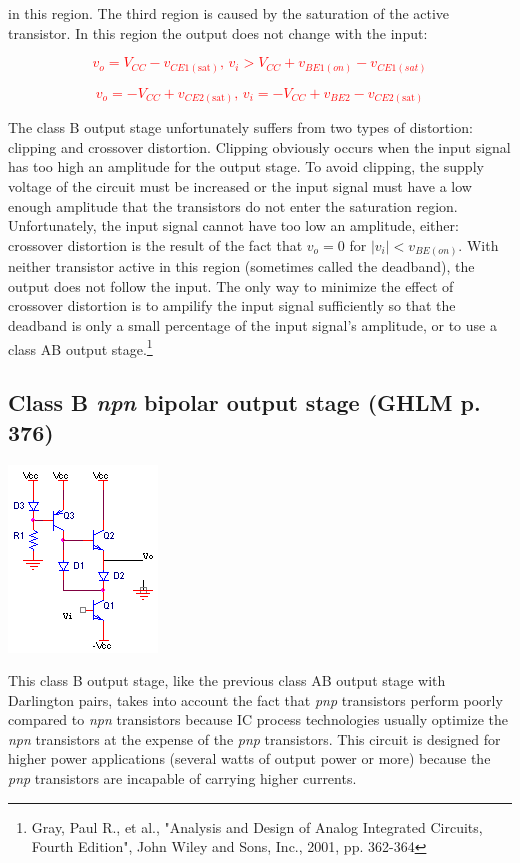 in this region. The third region is caused by the saturation of the active transistor. In this region the output does not change with the input:

\textcolor{red}{
\begin{equation}
v_{o} = V_{CC}-v_{CE1(\text{sat})}\text{, }v_{i} > V_{CC} + v_{BE1(on)} - v_{CE1(sat)}
\end{equation}
}

\textcolor{red}{
\begin{equation}
v_{o} = -V_{CC}+v_{CE2(\text{sat})}\text{, }v_{i} = -V_{CC}+v_{BE2}-v_{CE2(\text{sat})}
\end{equation}
}

\par
The class B output stage unfortunately suffers from two types of distortion: clipping and crossover distortion. Clipping obviously occurs when the input signal has too high an amplitude for the output stage. To avoid clipping, the supply voltage of the circuit must be increased or the input signal must have a low enough amplitude that the transistors do not enter the saturation region. Unfortunately, the input signal cannot have too low an amplitude, either: crossover distortion is the result of the fact that $v_{o} = 0$ for $|v_{i}| < v_{BE(on)}$. With neither transistor active in this region (sometimes called the deadband), the output does not follow the input. The only way to minimize the effect of crossover distortion is to ampilify the input signal sufficiently so that the deadband is only a small percentage of the input signal's amplitude, or to use a class AB output stage.\footnote{Gray, Paul R., et al., "Analysis and Design of Analog Integrated Circuits, Fourth Edition", John Wiley and Sons, Inc., 2001, pp. 362-364}

\subsection{Class B \textit{npn} bipolar output stage (GHLM p. 376)}
\begin{center}
	\includegraphics{schematics/npnClassBoutput.PNG}
\end{center}
This class B output stage, like the previous class AB output stage with Darlington pairs, takes into account the fact that \textit{pnp} transistors perform poorly compared to \textit{npn} transistors because IC process technologies usually optimize the \textit{npn} transistors at the expense of the \textit{pnp} transistors. This circuit is designed for higher power applications (several watts of output power or more) because the \textit{pnp} transistors are incapable of carrying higher currents.


